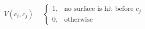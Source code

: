 \documentclass[border=6pt]{standalone}
\begin{document}
\color{black}
\(\displaystyle
V(c_i,c_j)=
\begin{cases}
1,&\text{no surface is hit before }c_j\\
0,&\text{otherwise}
\end{cases}
\)
\end{document}
